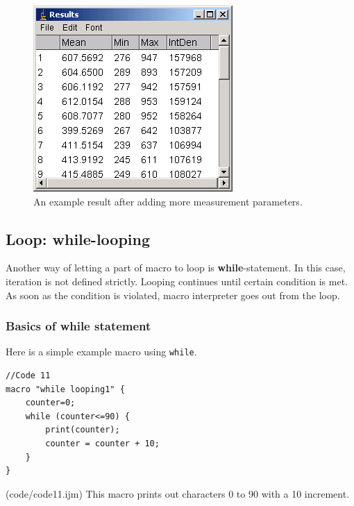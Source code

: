 \documentclass[11pt,a4paper,oneside]{report}
\newcommand{\ilcom}[1]{\texttt{\small#1}}
\begin{document}
\begin{figure}[htbp]
\begin{center}
\includegraphics[scale=0.5]{fig/fig2322_moreResultsTable.png}
\caption{An example result after adding more measurement parameters.}
\label{fig_MoreMeasurementPara}
\end{center}
\end{figure} 


\subsection{Loop: while-looping}

Another way of letting a part of macro to loop is \textbf{while}-statement. In this case, iteration is not defined strictly. Looping continues until certain condition is met. As soon as the condition is violated, macro interpreter goes out from the loop.

\subsubsection{Basics of while statement}
Here is a simple example macro using \ilcom{while}.

\begin{lstlisting}[morekeywords={*, while}]
//Code 11
macro "while looping1" {
	counter=0;
	while (counter<=90) {
		print(counter);
		counter = counter + 10;
	}
}
\end{lstlisting}
(code/code11.ijm)
This macro prints out characters 0 to 90 with a 10 increment. 
\end{document}

